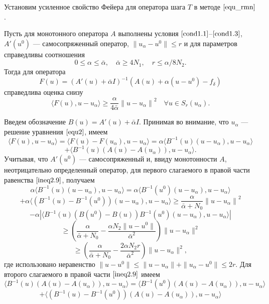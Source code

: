 Установим усиленное свойство Фейера для оператора шага $T$ в методе $\eqref{equ_rmn}$.
\begin{theorem}\label{teo2.2} Пусть для монотонного оператора $A$ выполнены условия $\eqref{cond1.1}$--$\eqref{cond1.3}$, $A'(u^0)$ --- самосопряженный оператор, $\|u_\alpha-u^0\|\le r$ и для параметров справедливы соотношения 
	\begin{equation}\label{cond2.7}
	0\le\alpha\le\bar\alpha,\quad\bar\alpha\ge 4N_1,\quad r\le\alpha/8N_2.
	\end{equation}
	Тогда для оператора
	$$ F(u)=(A'(u)+\bar\alpha I)^{-1}(A(u)+\alpha(u-u^0)-f_\delta) $$
	справедлива оценка снизу
	\begin{equation}\label{est2.8}
	\langle F(u), u-u_\alpha\rangle\ge\frac{\alpha}{4\bar\alpha}{\|u-u_\alpha\|}^2 \quad \forall u \in S_r(u_\alpha).
	\end{equation}
\end{theorem}
\proof Введем обозначение $B(u)=A'(u)+\bar\alpha I$. Принимая во внимание, что $u_\alpha$ --- решение уравнения $\eqref{equ2}$, имеем
$$
\langle F(u), u-u_\alpha\rangle=\langle F(u)-F(u_\alpha), u-u_\alpha\rangle=\alpha\langle B^{-1}(u)(u-u_\alpha), u-u_\alpha\rangle$$ \begin{equation}\label{ineq2.9}+\langle B^{-1}(u)(A(u)-A(u_\alpha)), u-u_\alpha\rangle.
\end{equation}
Учитывая, что $A'(u^0)$ --- самосопряженный и, ввиду монотонности $A$, неотрицательно определенный оператор, для первого слагаемого в правой части равенства $\eqref{ineq2.9}$, получаем
$$\alpha\langle B^{-1}(u)(u-u_\alpha), u-u_\alpha\rangle=\alpha\langle B^{-1}(u^0)(u-u_\alpha), u-u_\alpha\rangle$$ $$+\alpha\langle (B^{-1}(u)-B^{-1}(u^0))(u-u_\alpha), u-u_\alpha\rangle \ge \frac{\alpha}{\bar\alpha+N_0}{\|u-u_\alpha\|}^2$$
$$ - \alpha|\langle B^{-1}(u)(B(u^0)-B(u))B^{-1}(u^0)(u-u_\alpha), u-u_\alpha\rangle| $$
$$\ge \left( \frac{\alpha}{\bar\alpha+N_0}-\frac{\alpha N_2\|u-u^0\|}{{\bar\alpha}^2}\right)\|u-u_\alpha\|^2$$
\begin{equation}\label{ineq2.10}
\ge\left(\frac{\alpha}{\bar\alpha+N_0}-\frac{2\alpha N_2r}{{\bar\alpha}^2}\right)\|u-u_\alpha\|^2,
\end{equation} где использовано неравенство $\|u-u^0\|\le\|u-u_\alpha\|+\|u_\alpha-u^0\|\le 2r$.
Для второго слагаемого в правой части $\eqref{ineq2.9}$ имеем
$$ \langle B^{-1}(u)(A(u)-A(u_\alpha)), u-u_\alpha\rangle= \langle B^{-1}(u^0)(A(u)-A(u_\alpha)), u-u_\alpha\rangle$$
$$+\langle (B^{-1}(u)-B^{-1}(u^0))(A(u)-A(u_\alpha)), u-u_\alpha\rangle$$
